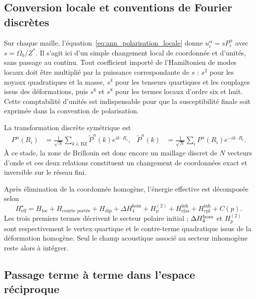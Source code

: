 \subsection{Conversion locale et conventions de Fourier discrètes}

Sur chaque maille, l'équation~\eqref{eq:ann_polarisation_locale} donne
$u_i^\alpha=sP_i^\alpha$ avec $s=\Omega_0/Z^*$. Il s'agit ici d'un simple
changement local de coordonnée et d'unités, sans passage au continu. Tout
coefficient importé de
l'Hamiltonien de modes locaux doit être multiplié par la puissance correspondante
de $s$ : $s^2$ pour les noyaux quadratiques et la masse, $s^4$ pour les tenseurs
quartiques et les couplages issus des déformations, puis $s^6$ et $s^8$ pour les
termes locaux d'ordre six et huit. Cette comptabilité d'unités est indispensable
pour que la susceptibilité finale soit exprimée dans la convention de
polarisation.

La transformation discrète symétrique est
\begin{equation}
\begin{aligned}
P^\alpha(R_i)&=\frac{1}{\sqrt N}\sum_{k\in\mathrm{BZ}}
\widetilde P^\alpha(k)e^{ik\cdot R_i},
&
\widetilde P^\alpha(k)&=\frac{1}{\sqrt N}\sum_i
P^\alpha(R_i)e^{-ik\cdot R_i}.
\end{aligned}
\label{eq:core_fourier_rules}
\end{equation}
À ce stade, la zone de Brillouin est donc encore un maillage discret de $N$
vecteurs d'onde et ces deux relations constituent un changement de coordonnées
exact et inversible sur le réseau fini.

Après élimination de la coordonnée homogène, l'énergie effective est
décomposée selon
\begin{equation}
H_{\mathrm{eff}}^{\star}
=H_{\mathrm{loc}}+H_{\text{courte portée}}+H_{\mathrm{dip}}
+\Delta H_4^{\mathrm{hom}}+H_{p}^{(2)}
+H_{\mathrm{elas}}^{\mathrm{inh}}+H_{\mathrm{cpl}}^{\mathrm{inh}}+C(p).
\label{eq:ann_decomposition_hamiltonien}
\end{equation}
Les trois premiers termes décrivent le secteur polaire initial ;
$\Delta H_4^{\rm hom}$ et $H_p^{(2)}$ sont respectivement le vertex quartique
et le contre-terme quadratique issus de la déformation homogène. Seul le champ
acoustique associé au secteur inhomogène reste alors à intégrer.

\subsection{Passage terme à terme dans l'espace réciproque}

